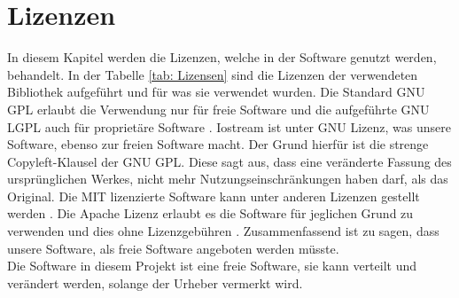 \section{Lizenzen}
In diesem Kapitel werden die Lizenzen, welche in der Software genutzt werden, behandelt. In der Tabelle \ref{tab: Lizensen} sind die Lizenzen der verwendeten Bibliothek aufgeführt und für was sie verwendet wurden. Die Standard GNU GPL erlaubt die Verwendung nur für freie Software und die aufgeführte GNU LGPL auch für proprietäre Software \cite{noauthor_gnuorg_nodate}. Iostream ist unter GNU Lizenz, was unsere Software, ebenso zur freien Software macht. Der Grund hierfür ist die strenge Copyleft-Klausel der GNU GPL. Diese sagt aus, dass eine veränderte Fassung des ursprünglichen Werkes, nicht mehr Nutzungseinschränkungen haben darf, als das Original.\cite{noauthor_copyleft_2020} Die MIT lizenzierte Software kann  unter anderen Lizenzen gestellt werden \cite{noauthor_mit_2020}. Die Apache Lizenz erlaubt es die Software für jeglichen Grund zu verwenden und dies ohne Lizenzgebühren \cite{noauthor_apache_2020}. Zusammenfassend ist zu sagen, dass unsere Software, als freie Software angeboten werden müsste.\\
Die Software in diesem Projekt ist eine freie Software, sie kann verteilt und verändert werden, solange der Urheber vermerkt wird.

